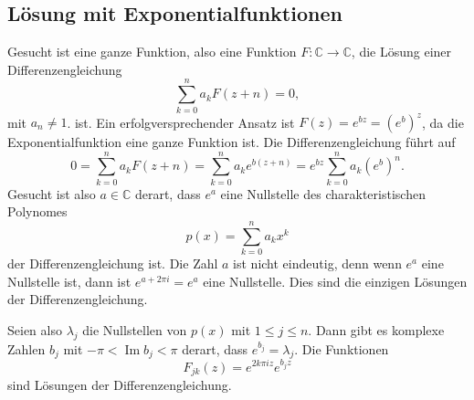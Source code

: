 %
%
\subsection{Lösung mit Exponentialfunktionen}
Gesucht ist eine ganze Funktion, also eine Funktion
$F\colon\mathbb{C}\to\mathbb{C}$, die Lösung einer
Differenzengleichung
%
\begin{equation}
\sum_{k=0}^n a_kF(z+n)=0,
\end{equation}
mit $a_n\ne 1$.
ist.
Ein erfolgversprechender Ansatz ist $F(z)=e^{bz}=(e^b)^z$, da die
Exponentialfunktion eine ganze Funktion ist.
Die Differenzengleichung führt auf
\[
0
=
\sum_{k=0}^n
a_kF(z+n)
=
\sum_{k=0}^n
a_k e^{b(z+n)}
=
e^{bz}
\sum_{k=0}^n
a_k (e^b)^n.
\]
Gesucht ist also $a\in\mathbb{C}$ derart, dass $e^a$ eine Nullstelle
des charakteristischen Polynomes
%
%
\[
p(x) = \sum_{k=0}^n a_kx^k
\]
der Differenzengleichung ist.
Die Zahl $a$ ist nicht eindeutig, denn wenn $e^a$ eine Nullstelle ist,
dann ist $e^{a+2\pi i}=e^a$ eine Nullstelle.
Dies sind die einzigen Lösungen der Differenzengleichung.

Seien also $\lambda_j$ die Nullstellen von $p(x)$ mit $1\le j\le n$.
Dann gibt es komplexe Zahlen $b_j$ 
mit $-\pi < \operatorname{Im}b_j < \pi$ derart, dass $e^{b_j}=\lambda_j$.
Die Funktionen
\[
F_{jk}(z) = e^{2k\pi i z} e^{b_jz}
\]
sind Lösungen der Differenzengleichung.

%
%
